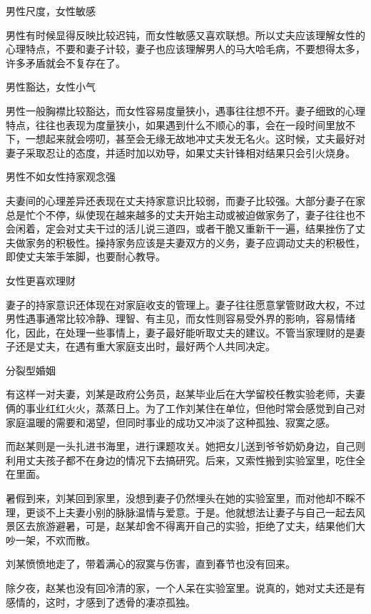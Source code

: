 \documentclass[12pt,UTF8]{ctexbook}
\begin{document}
男性尺度，女性敏感

男性有时候显得反映比较迟钝，而女性敏感又喜欢联想。所以丈夫应该理解女性的心理特点，不要和妻子计较，妻子也应该理解男人的马大哈毛病，不要想得太多，许多矛盾就会不复存在了。

男性豁达，女性小气

男性一般胸襟比较豁达，而女性容易度量狭小，遇事往往想不开。妻子细致的心理特点，往往也表现为度量狭小，如果遇到什么不顺心的事，会在一段时间里放不下，一想起来就会唠叨，甚至会无缘无故地冲丈夫发无名火。这时候，丈夫最好对妻子采取忍让的态度，并适时加以劝导，如果丈夫针锋相对结果只会引火烧身。

男性不如女性持家观念强

夫妻间的心理差异还表现在丈夫持家意识比较弱，而妻子比较强。大部分妻子在家总是忙个不停，纵使现在越来越多的丈夫开始主动或被迫做家务了，妻子往往也不会闲着，定会对丈夫干过的活儿说三道四，或者干脆又重新干一遍，结果挫伤了丈夫做家务的积极性。操持家务应该是夫妻双方的义务，妻子应调动丈夫的积极性，即使丈夫笨手笨脚，也要耐心教导。

女性更喜欢理财

妻子的持家意识还体现在对家庭收支的管理上。妻子往往愿意掌管财政大权，不过男性遇事通常比较冷静、理智、有主见，而女性则容易受外界的影响，容易情绪化，因此，在处理一些事情上，妻子最好能听取丈夫的建议。不管当家理财的是妻子还是丈夫，在遇有重大家庭支出时，最好两个人共同决定。





分裂型婚姻


有这样一对夫妻，刘某是政府公务员，赵某毕业后在大学留校任教实验老师，夫妻俩的事业红红火火，蒸蒸日上。为了工作刘某住在单位，但他时常会感觉到自己对家庭温暖的需要和渴望，但同时事业的成功又冲淡了这种孤独、寂寞之感。

而赵某则是一头扎进书海里，进行课题攻关。她把女儿送到爷爷奶奶身边，自己则利用丈夫孩子都不在身边的情况下去搞研究。后来，又索性搬到实验室里，吃住全在里面。

暑假到来，刘某回到家里，没想到妻子仍然埋头在她的实验室里，而对他却不睬不理，更谈不上夫妻小别的脉脉温情与爱意。于是。他就想法让妻子与自己一起去风景区去旅游避暑，可是，赵某却舍不得离开自己的实验，拒绝了丈夫，结果他们大吵一架，不欢而散。

刘某愤愤地走了，带着满心的寂寞与伤害，直到春节也没有回来。

除夕夜，赵某也没有回冷清的家，一个人呆在实验室里。说真的，她对丈夫还是有感情的，这时，才感到了透骨的凄凉孤独。
\end{document}
